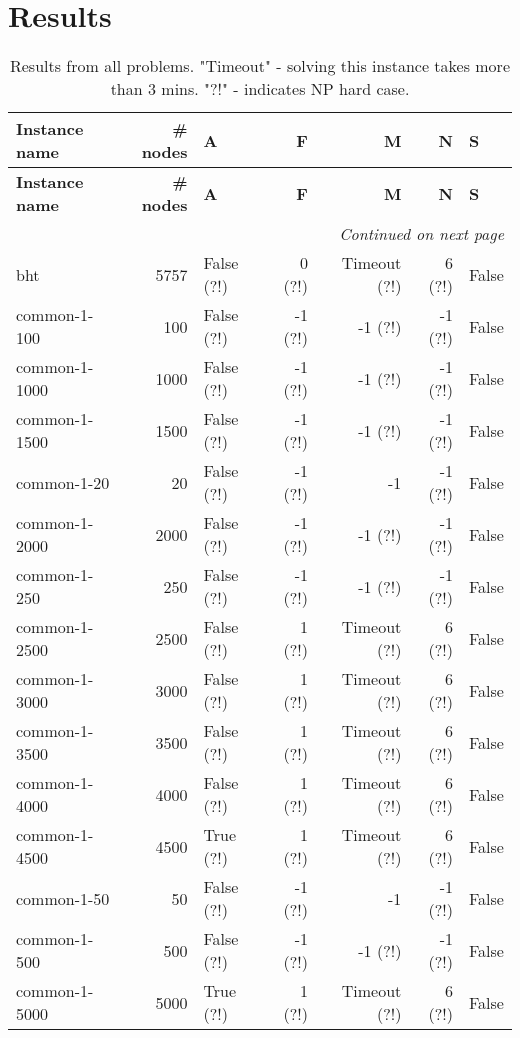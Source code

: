 \section{Results}
 \begin{longtable}{lrlrrrl} \caption{Results from all problems. \n "Timeout" - solving this instance takes more than 3 mins. "?!" - indicates NP hard case.}\label{table:results}\\ \toprule  \textbf{Instance name}& \textbf{\# nodes}& \textbf{A}& \textbf{F}& \textbf{M}& \textbf{N}& \textbf{S}\\
\midrule
\endfirsthead
\toprule
 \textbf{Instance name}& \textbf{\# nodes}& \textbf{A}& \textbf{F}& \textbf{M}& \textbf{N}& \textbf{S}\\
\midrule
\endhead
\midrule
\multicolumn{7}{r}{\textit{Continued on next page}} \\
\midrule
\endfoot
\bottomrule
\endlastfoot
bht & 5757 & False (?!) & 0 (?!) & Timeout (?!) & 6 (?!) & False \\
common-1-100 & 100 & False (?!) & -1 (?!) & -1 (?!) & -1 (?!) & False \\
common-1-1000 & 1000 & False (?!) & -1 (?!) & -1 (?!) & -1 (?!) & False \\
common-1-1500 & 1500 & False (?!) & -1 (?!) & -1 (?!) & -1 (?!) & False \\
common-1-20 & 20 & False (?!) & -1 (?!) & -1 & -1 (?!) & False \\
common-1-2000 & 2000 & False (?!) & -1 (?!) & -1 (?!) & -1 (?!) & False \\
common-1-250 & 250 & False (?!) & -1 (?!) & -1 (?!) & -1 (?!) & False \\
common-1-2500 & 2500 & False (?!) & 1 (?!) & Timeout (?!) & 6 (?!) & False \\
common-1-3000 & 3000 & False (?!) & 1 (?!) & Timeout (?!) & 6 (?!) & False \\
common-1-3500 & 3500 & False (?!) & 1 (?!) & Timeout (?!) & 6 (?!) & False \\
common-1-4000 & 4000 & False (?!) & 1 (?!) & Timeout (?!) & 6 (?!) & False \\
common-1-4500 & 4500 & True (?!) & 1 (?!) & Timeout (?!) & 6 (?!) & False \\
common-1-50 & 50 & False (?!) & -1 (?!) & -1 & -1 (?!) & False \\
common-1-500 & 500 & False (?!) & -1 (?!) & -1 (?!) & -1 (?!) & False \\
common-1-5000 & 5000 & True (?!) & 1 (?!) & Timeout (?!) & 6 (?!) & False \\

\end{longtable}
